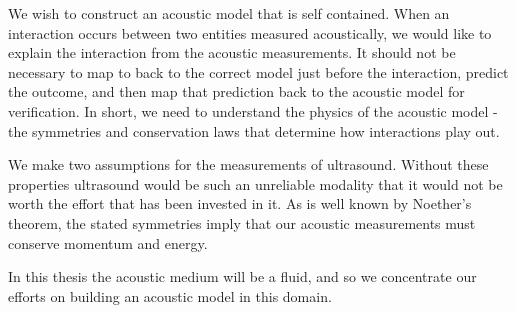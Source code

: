 We wish to construct an acoustic model that is self contained.
When an interaction occurs between two entities measured acoustically,
we would like to explain the interaction from the acoustic measurements.
It should not be necessary to map to back to the correct model just before the interaction,
predict the outcome, and then map that prediction back to the acoustic model for verification.
In short, we need to understand the physics of the acoustic model - the symmetries and conservation laws
that determine how interactions play out.

We make two assumptions for the measurements of ultrasound.
Without these properties ultrasound would be such an unreliable modality
that it would not be worth the effort that has been invested in it.
As is well known by Noether's theorem,
the stated symmetries imply that our acoustic measurements must conserve momentum and energy.


In this thesis the acoustic medium will be a fluid,
and so we concentrate our efforts on building an acoustic model in this domain.







